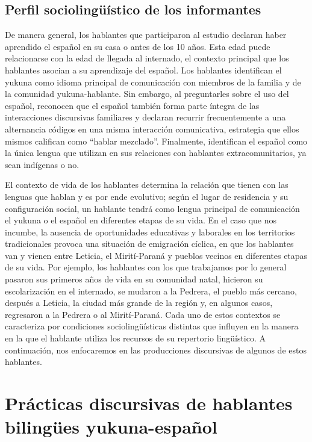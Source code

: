 \documentclass[output=paper]{langscibook}
\begin{document}
\subsection{Perfil sociolingüístico de los informantes}


De manera general, los hablantes que participaron al estudio declaran haber aprendido el español en su casa o antes de los 10 años. Esta edad puede relacionarse con la edad de llegada al internado, el contexto principal que los hablantes asocian a su aprendizaje del español. Los hablantes identifican el yukuna como idioma principal de comunicación con miembros de la familia y de la comunidad yukuna-hablante. Sin embargo, al preguntarles sobre el uso del español, reconocen que el español también forma parte íntegra de las interacciones discursivas familiares y declaran recurrir frecuentemente a una alternancia códigos en una misma interacción comunicativa, estrategia que ellos mismos califican como “hablar mezclado”. Finalmente, identifican el español como la única lengua que utilizan en sus relaciones con hablantes extracomunitarios, ya sean indígenas o no.

El contexto de vida de los hablantes determina la relación que tienen con las lenguas que hablan y es por ende evolutivo; según el lugar de residencia y su configuración social, un hablante tendrá como lengua principal de comunicación el yukuna o el español en diferentes etapas de su vida. En el caso que nos incumbe, la ausencia de oportunidades educativas y laborales en los territorios tradicionales provoca una situación de emigración cíclica, en que los hablantes van y vienen entre Leticia, el Mirití-Paraná y pueblos vecinos en diferentes etapas de su vida. Por ejemplo, los hablantes con los que trabajamos por lo general pasaron sus primeros años de vida en su comunidad natal, hicieron su escolarización en el internado, se mudaron a la Pedrera, el pueblo más cercano, después a Leticia, la ciudad más grande de la región y, en algunos casos, regresaron a la Pedrera o al Mirití-Paraná. Cada uno de estos contextos se caracteriza por condiciones sociolingüísticas distintas que influyen en la manera en la que el hablante utiliza los recursos de su repertorio lingüístico. A continuación, nos enfocaremos en las producciones discursivas de algunos de estos hablantes.

\section{ Prácticas discursivas de hablantes bilingües yukuna-español}
\end{document}
